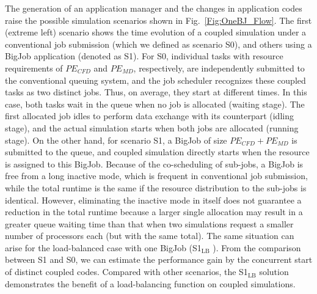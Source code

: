 \documentclass[preprint,12pt]{elsarticle}
\newcommand{\subscript}[1]{\ensuremath{_{\textrm{#1}}}}
\newcommand{\lb}[0]{\subscript{LB} }
\begin{document}
The generation of an application manager and the changes in application codes raise the possible simulation scenarios shown in Fig.~\ref{Fig:OneBJ_Flow}. The first (extreme left) scenario shows the time evolution of a coupled simulation under a conventional job submission (which we defined as scenario S0), and others using a BigJob application (denoted as S1). For S0, individual tasks with resource requirements of $PE_{CFD}$ and $PE_{MD}$, respectively, are independently submitted to the conventional queuing system, and the job scheduler recognizes these coupled tasks as two distinct jobs. Thus, on average, they start at different times. In this case, both tasks wait in the queue when no job is allocated (waiting stage). The first allocated job idles to perform data exchange with its counterpart (idling stage), and the actual simulation starts when both jobs are allocated (running stage). On the other hand, for scenario S1, a BigJob of size $PE_{CFD}+PE_{MD}$ is submitted to the queue, and coupled simulation directly starts when the resource is assigned to this BigJob. Because of the co-scheduling of sub-jobs, a BigJob is free from a long inactive mode, which is frequent in conventional job submission, while the total runtime is the same if the resource distribution to the sub-jobs is identical. However, eliminating the inactive mode in itself does not guarantee a reduction in the total runtime because a larger single allocation may result in a greater queue waiting time than that when two simulations request a smaller number of processors each (but with the same total). The same situation can arise for the load-balanced case with one BigJob (S1\lb). From the comparison between S1 and S0, we can estimate the performance gain by the concurrent start of distinct coupled codes. Compared with other scenarios, the S1\lb solution demonstrates the benefit of a load-balancing function on coupled simulations.
\end{document}
